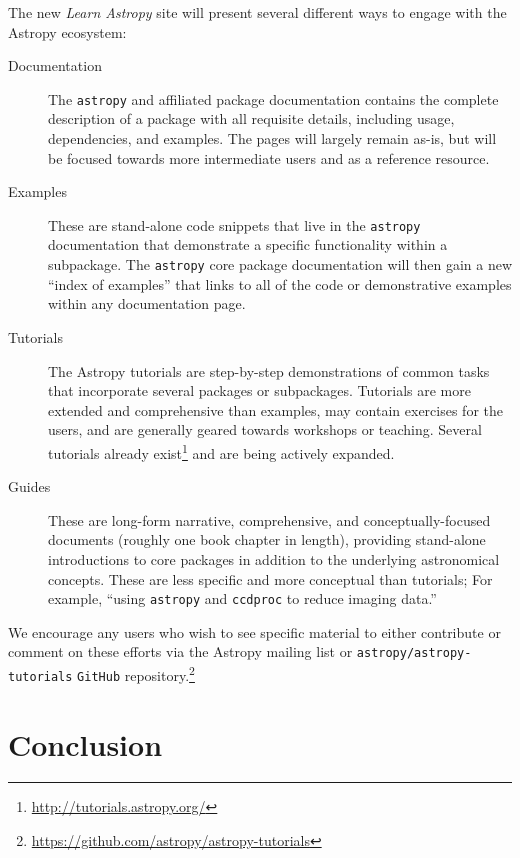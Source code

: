 \documentclass[modern]{aastex61}
\newcommand{\package}[1]{\texttt{#1}\xspace}
\newcommand{\github}{\package{GitHub}}
\newcommand{\astropy}{Astropy\xspace}
\newcommand{\astropypkg}{\package{astropy}}
\begin{document}
The new \emph{Learn Astropy} site will present several different ways to engage
with the \astropy ecosystem:
\begin{description}
    \item[Documentation] The \astropypkg and affiliated package documentation
        contains the complete description of a package with all requisite
        details, including usage, dependencies, and examples.
        The pages will largely remain as-is, but will be focused towards more
        intermediate users and as a reference resource.
    \item[Examples] These are stand-alone code snippets that live in the
        \astropypkg documentation that demonstrate a specific functionality
        within a subpackage.
        The \astropypkg core package documentation will then gain a new ``index
        of examples'' that links to all of the code or demonstrative examples
        within any documentation page.
    \item[Tutorials] The \astropy tutorials are step-by-step demonstrations of
        common tasks that incorporate several packages or subpackages.
        Tutorials are more extended and comprehensive than examples, may contain
        exercises for the users, and are generally geared towards workshops or
        teaching.
        Several tutorials already
        exist\footnote{\url{http://tutorials.astropy.org/}} and are being
        actively expanded.
    \item[Guides] These are long-form narrative, comprehensive, and
        conceptually-focused documents (roughly one book chapter in length),
        providing stand-alone introductions to core packages in addition to the
        underlying astronomical concepts.
        These are less specific and more conceptual than tutorials;
        For example, ``using \astropypkg and \package{ccdproc} to reduce imaging
        data.''
\end{description}
We encourage any users who wish to see specific material to either contribute or
comment on these efforts via the \astropy mailing list or \package{astropy/astropy-tutorials}
\github repository.\footnote{\url{https://github.com/astropy/astropy-tutorials}}

\section{Conclusion}
\label{sec:conclusion}
\end{document}
